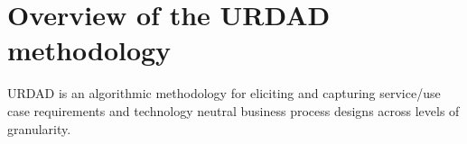 \section{Overview of the URDAD methodology \label{sec:urdadMethodology}}

URDAD is an algorithmic methodology for eliciting and capturing service/use case requirements and
technology neutral business process designs across levels of granularity.